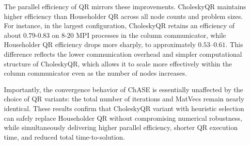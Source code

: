 The parallel efficiency of QR mirrors these improvements. CholeskyQR maintains higher efficiency than Householder QR across all node counts and problem sizes.
For instance, in the largest configuration, CholeskyQR retains an efficiency of about $0.79$-$0.83$ on $8$-$20$ MPI processes in the column communicator, while Householder QR efficiency drops more sharply, to approximately $0.53$–$0.61$. This difference reflects the lower communication overhead and simpler computational structure of CholeskyQR, which allows it to scale more effectively within the column communicator even as the number of nodes increases.

Importantly, the convergence behavior of ChASE is essentially unaffected by the choice of QR variants: the total number of iterations and MatVecs remain nearly identical. These results confirm that CholeskyQR variant with heuristic selection can safely replace Householder QR without compromising numerical robustness, while simultaneously delivering higher parallel efficiency, shorter QR execution time, and reduced total time-to-solution.


